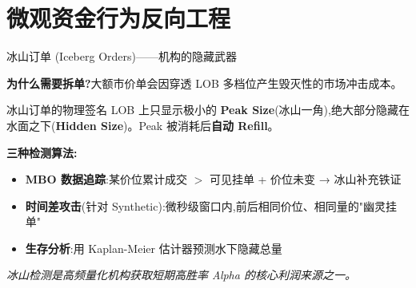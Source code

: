 \documentclass[10pt,aspectratio=169]{beamer}
\begin{document}
\section{微观资金行为反向工程}

\begin{frame}{冰山订单 (Iceberg Orders)——机构的隐藏武器}

  \textbf{为什么需要拆单?}大额市价单会因穿透 LOB 多档位产生\alert{毁灭性的市场冲击成本}。

  \vfill

  \begin{block}{冰山订单的物理签名}
    LOB 上只显示极小的 \textbf{Peak Size}(冰山一角),绝大部分隐藏在水面之下(\textbf{Hidden Size})。Peak 被消耗后\textbf{自动 Refill}。
  \end{block}

  \vfill

  \textbf{三种检测算法:}

  \begin{itemize}
    \item \textbf{MBO 数据追踪}:某价位累计成交 $>$ 可见挂单 + 价位未变 → 冰山补充铁证
    \item \textbf{时间差攻击}(针对 Synthetic):微秒级窗口内,前后相同价位、相同量的"幽灵挂单"
    \item \textbf{生存分析}:用 Kaplan-Meier 估计器预测水下隐藏总量
  \end{itemize}

  \vfill

  \centering\small
  \emph{冰山检测是高频量化机构获取短期高胜率 Alpha 的核心利润来源之一。}

\end{frame}
\end{document}
